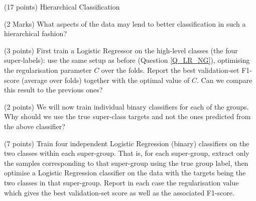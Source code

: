 \documentclass[12pt]{article}
\begin{document}



\begin{question}{(17 points) Hierarchical Classification}




\begin{subquestion}{(2 Marks) What aspects of the data may lend to better classification in such a hierarchical fashion?}






\end{subquestion}

\begin{subquestion}{(3 points) First train a Logistic Regressor on the high-level classes (\ie the four super-labels): use the same setup as before (Question \ref{Q_LR_NG}), optimising the regularisation parameter $C$ over the folds. Report the best validation-set F1-score (average over folds) together with the optimal value of $C$. } Can we compare this result to the previous ones?






\end{subquestion}

\begin{subquestion}{(2 points) We will now train individual binary classifiers for each of the groups. Why should we use the true super-class targets and not the ones predicted from the above classifier?}






\end{subquestion}

\begin{subquestion}{(7 points) Train four independent Logistic Regression (binary) classifiers on the two classes within each super-group. That is, for each super-group, extract only the samples corresponding to that super-group using the true group label, then optimise a Logistic Regression classifier on the data with the targets being the two classes in that super-group. Report in each case the regularisation value which gives the best validation-set score as well as the associated F1-score. }




\end{subquestion}
\end{question}
\end{document}
